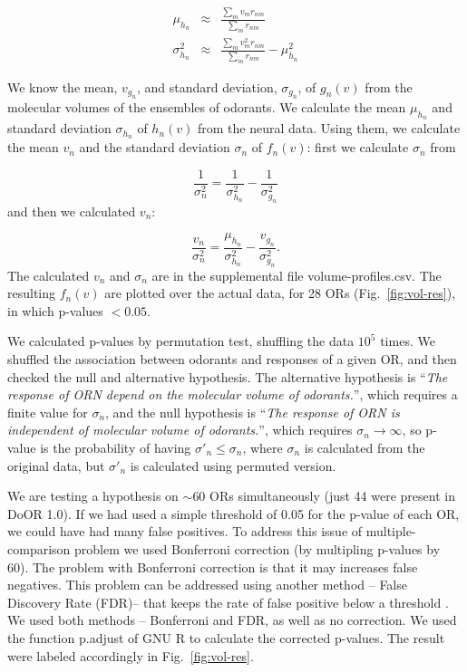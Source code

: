\documentclass[11pt]{paper} %
\newcommand{\numberofreceptors}{ 28 }
\begin{document}
\begin{eqnarray}
	\mu_{h_n} &\approx& \frac{\displaystyle \sum_{m} v_m r_{nm}}{\displaystyle \sum_{m} r_{nm}} \\
	\sigma_{h_n}^2 &\approx& \frac{\displaystyle \sum_{m} v_m^2 r_{nm}}{\displaystyle \sum_{m} r_{nm}} - \mu_{h_n}^2
	\label{eqn:final_h}
\end{eqnarray}


We know the mean, $v_{g_n}$, and standard deviation, $\sigma_{g_n}$, of $g_n(v)$ from the molecular volumes of the ensembles of odorants. 
We calculate the mean $\mu_{h_n}$ and standard deviation $\sigma_{h_n}$ of $h_n(v)$ from the neural data.
Using them, we calculate the mean $v_n$ and the standard deviation $\sigma_n$ of $f_n(v)$:
first we calculate $\sigma_n$ from 

\begin{equation}
	\frac{1}{\sigma_n^2} = \frac{1}{\sigma^2_{h_n}}  - \frac{1}{\sigma^2_{g_n}}
\end{equation}
and then we calculated $v_n$: 

\begin{equation}
	\frac{v_n}{\sigma_n^2}  =    \frac{\mu_{h_n}}{\sigma^2_{h_n}} - \frac{v_{g_n}}{\sigma^2_{g_n}}.
\end{equation}
The calculated $v_n$ and $\sigma_n$ are in the supplemental file volume-profiles.csv. 
The resulting $f_n(v)$ are plotted over the actual data, for \numberofreceptors ORs (Fig.~\ref{fig:vol-res}),
in which p-values $<0.05$. 

We calculated p-values by permutation test, shuffling the data $10^5$ times. 
We shuffled the association between odorants and responses of a given OR,  
and then checked the null and alternative hypothesis. 
The alternative hypothesis is
``{\it The response of ORN depend on the molecular volume of odorants.}'', 
which requires  a finite value for $\sigma_n$, 
and the null hypothesis is 
``{\it The response of ORN is independent of molecular volume of odorants.}'',
which requires $\sigma_n \rightarrow \infty$, 
so p-value is the probability of having $\sigma'_n\leq\sigma_n$, 
where $\sigma_n$ is calculated from the original data, but $\sigma'_n$ is calculated using permuted version. 

We are testing a hypothesis on $\sim$60 ORs simultaneously (just 44 were present in DoOR 1.0). 
If we had used a simple threshold of 0.05 for the p-value of each OR, we could have had many false positives. 
To address this issue of multiple-comparison problem 
we used Bonferroni correction (by multipling p-values by 60). 
The problem with Bonferroni correction is that it may increases false negatives.
This problem can be addressed using another method -- False Discovery Rate (FDR)--  that keeps the rate of false positive below a threshold \cite{benjamini1995controlling,shaffer1995multiple}.
We used both methods -- Bonferroni and FDR, as well as no correction. We used the function p.adjust of GNU R to calculate the corrected p-values. 
The result were labeled accordingly in Fig.~\ref{fig:vol-res}.
\end{document}

